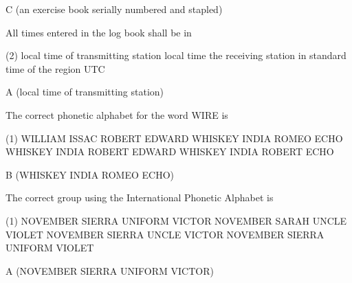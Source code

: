 \documentclass[a4paper]{article}
\begin{document}
\begin{solution}
	C (an exercise book serially numbered and stapled)
\end{solution}

\vspace{5mm}



\begin{question}All times entered in the log book shall be in
	\begin{tasks}(2)
		\task local time of transmitting station
		\task local time the receiving station
		\task in standard time of the region
		\task UTC
	\end{tasks}
\end{question}

\begin{solution}
	A (local time of transmitting station)
\end{solution}

\vspace{5mm}



\begin{question}The correct phonetic alphabet for the word WIRE is
	\begin{tasks}(1)
		\task WILLIAM ISSAC ROBERT EDWARD
		\task WHISKEY INDIA ROMEO ECHO
		\task WHISKEY INDIA ROBERT EDWARD
		\task WHISKEY INDIA ROBERT ECHO
	\end{tasks}
\end{question}

\begin{solution}
	B (WHISKEY INDIA ROMEO ECHO)
\end{solution}

\vspace{5mm}



\begin{question}The correct group using the International Phonetic Alphabet is
	\begin{tasks}(1)
		\task NOVEMBER SIERRA UNIFORM VICTOR
		\task NOVEMBER SARAH UNCLE VIOLET
		\task NOVEMBER SIERRA UNCLE VICTOR
		\task NOVEMBER SIERRA UNIFORM VIOLET
	\end{tasks}
\end{question}

\begin{solution}
	A (NOVEMBER SIERRA UNIFORM VICTOR)
\end{solution}

\vspace{5mm}
\end{document}
